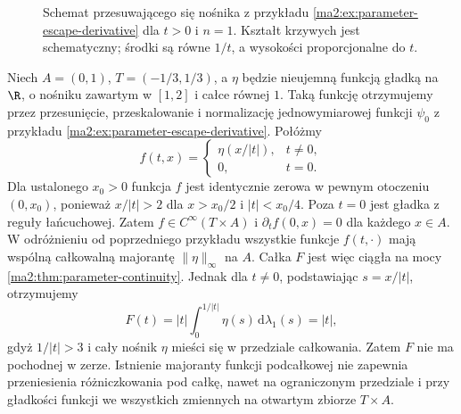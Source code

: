 \begin{figure}[htbp]
\centering
{}
\caption{Schemat przesuwającego się nośnika z przykładu
\ref{ma2:ex:parameter-escape-derivative} dla $t>0$
i $n=1$. Kształt krzywych jest schematyczny;
środki są równe $1/t$, a wysokości proporcjonalne do $t$.}
\label{ma2:fig:parameter-escape}
\end{figure}

\begin{przyklad}
\label{ma2:ex:parameter-bounded-concentration}
Niech $A=(0,1)$, $T=(-1/3,1/3)$, a $\eta$ będzie
nieujemną funkcją gładką na $\R$, o nośniku
zawartym w $[1,2]$ i całce równej $1$.
Taką funkcję otrzymujemy przez przesunięcie,
przeskalowanie i normalizację jednowymiarowej
funkcji $\psi_0$ z przykładu
\ref{ma2:ex:parameter-escape-derivative}.
Połóżmy
\[
 f(t,x)=
 \begin{cases}
 \eta(x/|t|),&t\ne0,\\
 0,&t=0.
 \end{cases}
\]
Dla ustalonego $x_0>0$ funkcja $f$ jest identycznie
zerowa w pewnym otoczeniu $(0,x_0)$, ponieważ
$x/|t|>2$ dla $x>x_0/2$ i $|t|<x_0/4$.
Poza $t=0$ jest gładka z reguły łańcuchowej.
Zatem $f\in C^\infty(T\times A)$ i
$\partial_t f(0,x)=0$ dla każdego $x\in A$.
W odróżnieniu od poprzedniego przykładu wszystkie
funkcje $f(t,\cdot)$ mają wspólną całkowalną
majorantę $\|\eta\|_\infty$ na $A$.
Całka $F$ jest więc ciągła na mocy
\ref{ma2:thm:parameter-continuity}.
Jednak dla $t\ne0$, podstawiając $s=x/|t|$,
otrzymujemy
\[
 F(t)=|t|\int_0^{1/|t|}\eta(s)\,
 \mathrm d\lambda_1(s)=|t|,
\]
gdyż $1/|t|>3$ i cały nośnik $\eta$
mieści się w przedziale całkowania.
Zatem $F$ nie ma pochodnej w zerze.
Istnienie majoranty funkcji podcałkowej
nie zapewnia przeniesienia różniczkowania pod całkę,
nawet na ograniczonym przedziale i przy
gładkości funkcji we wszystkich zmiennych
na otwartym zbiorze $T\times A$.
\end{przyklad}

